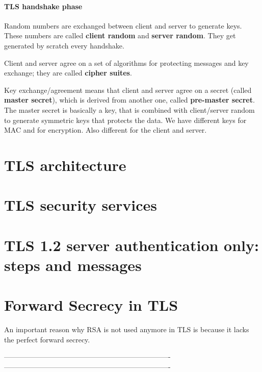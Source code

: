 \paragraph{TLS handshake phase}
Random numbers are exchanged between client and server to generate keys. These numbers are called \textbf{client random} and \textbf{server random}. They get generated by scratch every handshake.

Client and server agree on a set of algorithms for protecting messages and key exchange; they are called \textbf{cipher suites}.

Key exchange/agreement means that client and server agree on a secret (called \textbf{master secret}), which is derived from another one, called \textbf{pre-master secret}. The master secret is basically a key, that is combined with client/server random to generate symmetric keys that protects the data. We have different keys for MAC and for encryption. Also different for the client and server.

\section{TLS architecture}
\section{TLS security services}
\section{TLS 1.2 server authentication only: steps and messages}

\section{Forward Secrecy in TLS}
An important reason why RSA is not used anymore in TLS is because it lacks the perfect forward secrecy.


----------------------------------------------------------------------
----------------------------------------------------------------------

\clearpage
